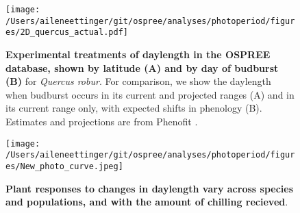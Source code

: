 \documentclass{article}
\begin{document}
\begin{figure}[p]
\texttt{[image: /Users/aileneettinger/git/ospree/analyses/photoperiod/figures/2D\_quercus\_actual.pdf]} 
\caption{\textbf{Experimental treatments of daylength in the OSPREE database, shown by latitude (A) and by day of budburst (B)} for \textit{Quercus robur}. For comparison, we show the daylength when budburst occurs in its current and projected ranges (A) and in its current range only, with expected shifts in phenology (B). Estimates and projections are from Phenofit \citep{duputie2015}.}
 \label{fig:quercus}
 \end{figure}
 
 \begin{figure}[p]
\texttt{[image: /Users/aileneettinger/git/ospree/analyses/photoperiod/figures/New\_photo\_curve.jpeg]} 
\caption{\textbf{Plant responses to changes in daylength vary across species and populations, and with the amount of chilling recieved}.}
 \label{fig:photocurve}
 \end{figure}
\end{document}
